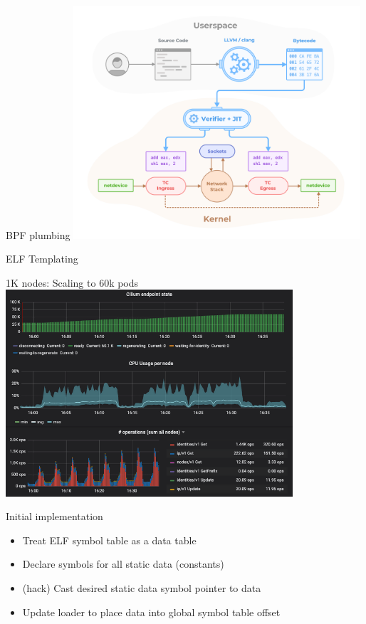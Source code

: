 \documentclass[black,white]{beamer}
\DeclareRobustCommand{\#}{\adjustbox{valign=B,totalheight=.57\baselineskip}{\oldhash}}%
\begin{document}
    \begin{frame}{BPF plumbing}
        \centering
        \includegraphics[width=0.8\textwidth,keepaspectratio]{bpf-verifier.png}
    \end{frame}


    \begin{frame}{ELF Templating}
        \centering
        
    \end{frame}

    \begin{frame}{1K nodes: Scaling to 60k pods}
        \centering
        \includegraphics[width=0.8\textwidth]{scaling_to_60k_pods.png}
    \end{frame}

    \begin{frame}{Initial implementation}
        \begin{itemize}
            \item Treat ELF symbol table as a data table \medskip
            \item Declare symbols for all static data (constants) \medskip
            \item (hack) Cast desired static data symbol pointer to data \medskip
            \item Update loader to place data into global symbol table offset \medskip
        \end{itemize}
    \end{frame}
\end{document}
